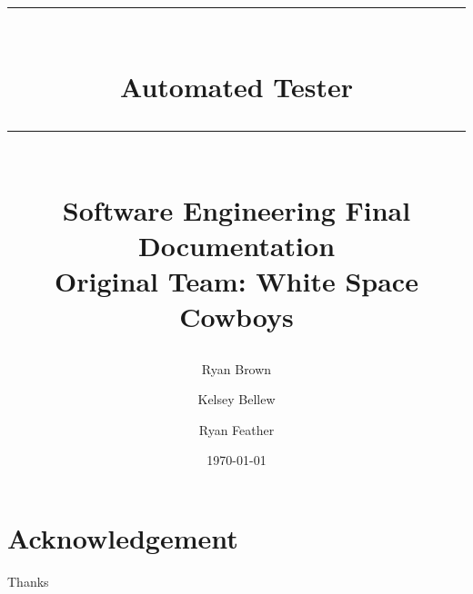 \documentclass{book}
\title{{\color{MSBlue1} \rule{\linewidth}{0.5mm}}\\[2mm] {\huge \bfseries \color{MSBlue1} Automated Tester }\\[-1mm] {\color{MSBlue1}\rule{\linewidth}{0.5mm}} \\  \vfill
{\LARGE \bfseries \color{MSBlue2} Software Engineering Final Documentation }\\  \vfill 
{\color{MSBlue1} Original Team: White Space Cowboys} }
\author{\color{MSBlue1}  Ryan Brown \and \color{MSBlue1} Kelsey Bellew \and  \color{MSBlue1} Ryan Feather }
\date{\color{MSBlue1} \today}
\begin{document}
\frontmatter
\maketitle


\tableofcontents
\listoffigures
\listoftables
\listofalgorithms




 
\mainmatter













\backmatter
\chapter{Acknowledgement}
\label{SpecialThanks}  Thanks  


\setcounter{section}{0}



\setcounter{section}{0}
%




\end{document}
